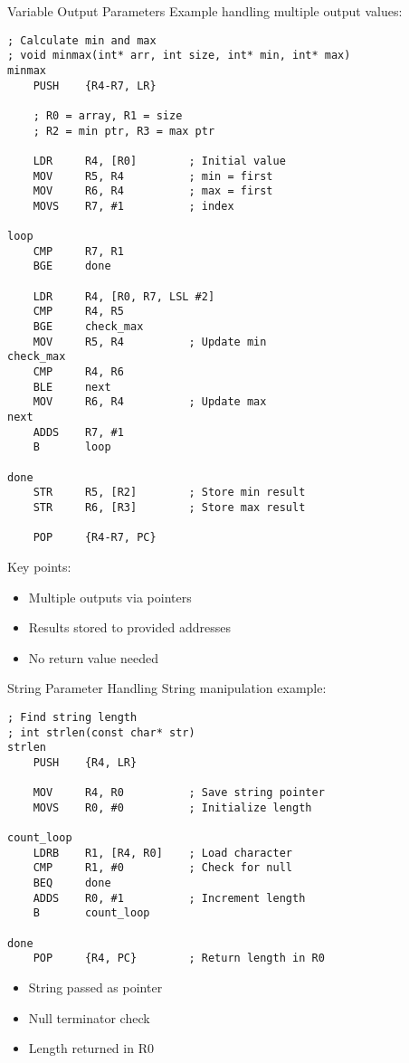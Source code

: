 \begin{example2}{Variable Output Parameters}
Example handling multiple output values:
\begin{lstlisting}[language=armasm, style=basesmol]
; Calculate min and max
; void minmax(int* arr, int size, int* min, int* max)
minmax
    PUSH    {R4-R7, LR}
    
    ; R0 = array, R1 = size
    ; R2 = min ptr, R3 = max ptr
    
    LDR     R4, [R0]        ; Initial value
    MOV     R5, R4          ; min = first
    MOV     R6, R4          ; max = first
    MOVS    R7, #1          ; index
    
loop
    CMP     R7, R1
    BGE     done
    
    LDR     R4, [R0, R7, LSL #2]
    CMP     R4, R5
    BGE     check_max
    MOV     R5, R4          ; Update min
check_max
    CMP     R4, R6
    BLE     next
    MOV     R6, R4          ; Update max
next
    ADDS    R7, #1
    B       loop
    
done
    STR     R5, [R2]        ; Store min result
    STR     R6, [R3]        ; Store max result
    
    POP     {R4-R7, PC}
\end{lstlisting}

Key points:
\begin{itemize}
  \item Multiple outputs via pointers
  \item Results stored to provided addresses
  \item No return value needed
\end{itemize}
\end{example2}

\begin{example2}{String Parameter Handling}
String manipulation example:
\begin{lstlisting}[language=armasm, style=basesmol]
; Find string length
; int strlen(const char* str)
strlen
    PUSH    {R4, LR}
    
    MOV     R4, R0          ; Save string pointer
    MOVS    R0, #0          ; Initialize length
    
count_loop
    LDRB    R1, [R4, R0]    ; Load character
    CMP     R1, #0          ; Check for null
    BEQ     done
    ADDS    R0, #1          ; Increment length
    B       count_loop
    
done
    POP     {R4, PC}        ; Return length in R0
\end{lstlisting}

\begin{itemize}
  \item String passed as pointer
  \item Null terminator check
  \item Length returned in R0
\end{itemize}
\end{example2}

